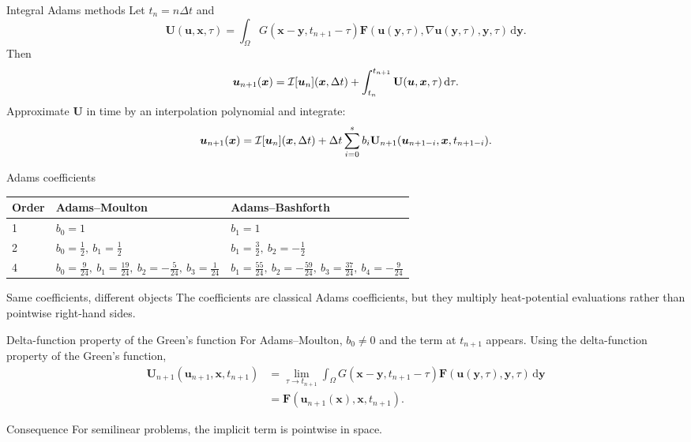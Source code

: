 \documentclass[aspectratio=169,10pt]{beamer}
\newcommand{\dd}{\,\mathrm d}
\newcommand{\x}{\bm{x}}
\newcommand{\y}{\bm{y}}
\newcommand{\uvec}{\bm{u}}
\newcommand{\dt}{\Delta t}
\begin{document}
\begin{frame}{Integral Adams methods}
\small
Let $t_n=n\dt$ and
\[
  \mathbf{U}(\uvec,\x,\tau)
  =
  \int_{\Omega}G(\x-\y,t_{n+1}-\tau)
  \bm{F}(\uvec(\y,\tau),\nabla\uvec(\y,\tau),\y,\tau)\dd\y.
\]
Then
\[
  \uvec_{n+1}(\x)=\Iop[\uvec_n](\x,\dt)
  +\int_{t_n}^{t_{n+1}}\mathbf{U}(\uvec,\x,\tau)\dd\tau.
\]
Approximate $\mathbf{U}$ in time by an interpolation polynomial and integrate:
\[
  \uvec_{n+1}(\x)=\Iop[\uvec_n](\x,\dt)
  +\dt\sum_{i=0}^s b_i
  \mathbf{U}_{n+1}(\uvec_{n+1-i},\x,t_{n+1-i}).
\]
\end{frame}

\begin{frame}{Adams coefficients}
\small
\begin{center}
\renewcommand{\arraystretch}{1.35}
\begin{tabular}{lll}
\toprule
Order & Adams--Moulton & Adams--Bashforth \\
\midrule
1 &
$b_0=1$ &
$b_1=1$ \\
2 &
$b_0=\frac12,\ b_1=\frac12$ &
$b_1=\frac32,\ b_2=-\frac12$ \\
4 &
$b_0=\frac9{24},\ b_1=\frac{19}{24},\
b_2=-\frac5{24},\ b_3=\frac1{24}$ &
$b_1=\frac{55}{24},\ b_2=-\frac{59}{24},\
b_3=\frac{37}{24},\ b_4=-\frac9{24}$ \\
\bottomrule
\end{tabular}
\end{center}

\begin{block}{Same coefficients, different objects}
The coefficients are classical Adams coefficients, but they multiply
heat-potential evaluations rather than pointwise right-hand sides.
\end{block}
\end{frame}

\begin{frame}{Delta-function property of the Green's function}
\small
For Adams--Moulton, $b_0\ne0$ and the term at $t_{n+1}$ appears.
Using the delta-function property of the Green's function,
\[
\begin{aligned}
\mathbf{U}_{n+1}(\uvec_{n+1},\x,t_{n+1})
&=\lim_{\tau\to t_{n+1}}
\int_{\Omega}G(\x-\y,t_{n+1}-\tau)
\bm{F}(\uvec(\y,\tau),\y,\tau)\dd\y \\
&=\bm{F}(\uvec_{n+1}(\x),\x,t_{n+1}).
\end{aligned}
\]

\begin{block}{Consequence}
For semilinear problems, the implicit term is pointwise in space.
\end{block}
\end{frame}
\end{document}
